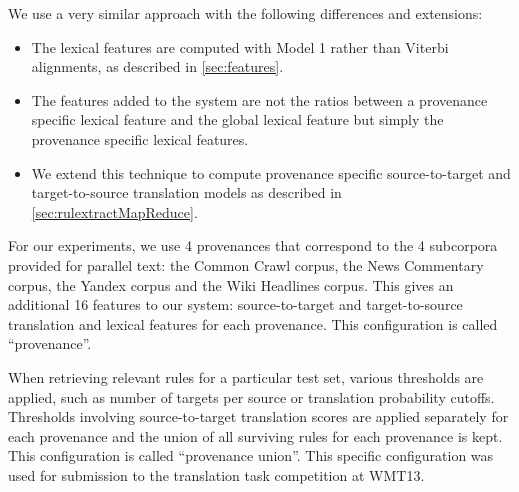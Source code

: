 We use a very similar approach with the following differences and
extensions:
%
\begin{itemize}
  \item The lexical features are computed with Model 1 rather than Viterbi alignments, as described in
    \autoref{sec:features}.
  \item The features added to the system are not the ratios between a
    provenance specific lexical feature and the global lexical feature but
    simply the provenance specific lexical features.
  \item We extend this technique to compute provenance specific
    source-to-target and target-to-source translation models
    as described in \autoref{sec:rulextractMapReduce}.
\end{itemize}
%
For our experiments, we use 4 provenances that correspond
to the 4 subcorpora provided for parallel text: the Common Crawl corpus, the
News Commentary corpus, the Yandex corpus and the Wiki Headlines
corpus. This gives an additional 16 features to our system: source-to-target
and target-to-source translation and lexical features for each provenance.
This configuration is called ``provenance''.

When retrieving relevant rules for a particular test set, various thresholds are applied, such %
as number of targets per source or translation probability cutoffs.
Thresholds involving source-to-target translation scores are applied separately for each
provenance and the union of all surviving rules for each provenance is kept. This 
configuration is called ``provenance union''. This specific configuration
was used for submission to the translation task competition at WMT13.

